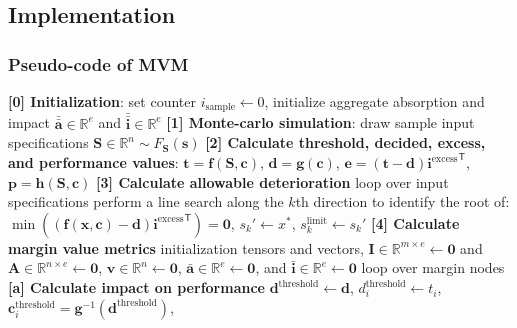 \subsection{Implementation}
\begin{frame}[fragile,t]
	\frametitle{Pseudo-code of MVM}
	\vspace{-1em}
	\begin{algorithm}[H] %
		\tiny
		\DontPrintSemicolon %
		\textbf{[0] Initialization}: 
			set counter $i_\mathrm{sample} \gets 0$, initialize aggregate absorption and impact $\bar{\bar{\mathbf{a}}} \in \mathbb{R}^e$ and $\bar{\bar{\mathbf{i}}} \in \mathbb{R}^e$\;
		\textbf{[1] Monte-carlo simulation}: 
			draw sample input specifications $\mathbf{S}\in\mathbb{R}^n \sim F_\mathbf{S}(\mathbf{s})$\;
		\textbf{[2] Calculate threshold, decided, excess, and performance values}: 
			$\mathbf{t} = \mathbf{f}(\mathbf{S},\mathbf{c})$, 
			$\mathbf{d} = \mathbf{g}(\mathbf{c})$, 
			$\mathbf{e} = \left(\mathbf{t} - \mathbf{d}\right){\mathbf{i}^\mathrm{excess}}^\mathsf{T}$, 
			$\mathbf{p} =  \mathbf{h}(\mathbf{S},\mathbf{c})$\;
		\textbf{[3] Calculate allowable deterioration}\;
		\qquad loop over input specifications  {
			\qquad perform a line search along the $k$th direction to identify the root of: 
				$\min{((\mathbf{f}(\mathbf{x},\mathbf{c}) - \mathbf{d}){\mathbf{i}^\mathrm{excess}}^\mathsf{T})} = \mathbf{0}$, $s_k' \gets x^*$, 
				$s_k^\mathrm{limit} \gets s_k'$\;
		}
		\textbf{[4] Calculate margin value metrics}\;
		\qquad initialization tensors and vectors, 
			$\mathbf{I} \in \mathbb{R}^{m\times e} \gets \mathbf{0}$ and $\mathbf{A} \in \mathbb{R}^{n\times e} \gets \mathbf{0}$, 
			$\mathbf{v} \in \mathbb{R}^{n} \gets \mathbf{0}$, $\bar{\mathbf{a}} \in \mathbb{R}^{e} \gets \mathbf{0}$, and $\bar{\mathbf{i}} \in \mathbb{R}^{e} \gets \mathbf{0}$\;
		\qquad loop over margin nodes  {  
			\qquad \textbf{[a] Calculate impact on performance}\;
			\qquad $\mathbf{d}^\mathrm{threshold} \gets \mathbf{d}$, $d_i^\mathrm{threshold} \gets t_i$, 
				$\mathbf{c}_i^\mathrm{threshold} = \mathbf{g}^{-1}(\mathbf{d}^\mathrm{threshold})$, 
}
\end{algorithm}
\end{frame}
